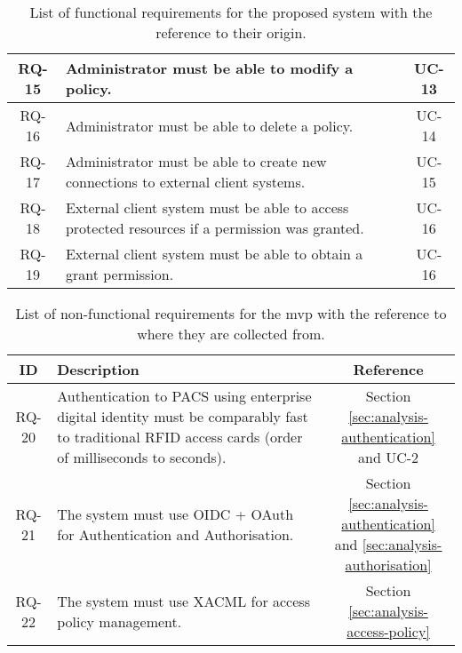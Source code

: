 \begin{table}[htbp!]
\begin{tabular}{|c|p{15cm}|c|}
    \hline
    RQ-15&Administrator must be able to modify a policy.&UC-13\\
    \hline
    RQ-16&Administrator must be able to delete a policy.&UC-14\\
    \hline
    \hline
    RQ-17&Administrator must be able to create new connections to external client systems.&UC-15\\
    \hline
    \hline
    RQ-18&External client system must be able to access protected resources if a permission was granted.&UC-16\\
    \hline
    RQ-19&External client system must be able to obtain a grant permission.&UC-16\\
    \hline
    \end{tabular}
    \caption{List of functional requirements for the proposed system with the reference to their origin.}
    \label{tab:functional-requirements}
\end{table}
% 
\begin{table}[htbp!]
    \footnotesize
    \onehalfspacing
    \centering
    \begin{tabular}{|c|p{15cm}|c|}
    \hline
    \cellcolor[HTML]{CBCEFB}\textbf{ID}&\cellcolor[HTML]{CBCEFB}\textbf{Description}&\cellcolor[HTML]{CBCEFB}\textbf{Reference}\\
    \hline
    RQ-20&Authentication to PACS using enterprise digital identity must be comparably fast to traditional RFID access cards (order of milliseconds to seconds).&\makecell{Section \ref{sec:analysis-authentication} \\ and UC-2}\\
    \hline
    RQ-21&The system must use OIDC + OAuth for Authentication and Authorisation.&\makecell{Section \ref{sec:analysis-authentication} \\ and \ref{sec:analysis-authorisation}}\\
    \hline
    RQ-22&The system must use XACML for access policy management.&Section \ref{sec:analysis-access-policy}\\
    \hline
    \end{tabular}
    \caption{List of non-functional requirements for the \acrshort{mvp} with the reference to where they are collected from.}
    \label{tab:nonfunctional-requirements}
\end{table}